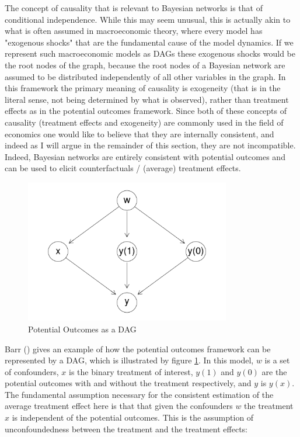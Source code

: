 \documentclass{article}
\begin{document}
The concept of causality that is relevant to Bayesian networks is that of conditional independence. While this may seem unusual, this is actually akin to what is often assumed in macroeconomic theory, where every model has "exogenous shocks" that are the fundamental cause of the model dynamics. If we represent such macroeconomic models as DAGs these exogenous shocks would be the root nodes of the graph, because the root nodes of a Bayesian network are assumed to be distributed independently of all other variables in the graph. In this framework the primary meaning of causality is exogeneity (that is in the literal sense, not being determined by what is observed), rather than treatment effects as in the potential outcomes framework. Since both of these concepts of causality (treatment effects and exogeneity) are commonly used in the field of economics one would like to believe that they are internally consistent, and indeed as I will argue in the remainder of this section, they are not incompatible. Indeed, Bayesian networks are entirely consistent with potential outcomes and can be used to elicit counterfactuals / (average) treatment effects.

\begin{figure}
  \centering
  \includegraphics[width=0.8\textwidth]{images/potential_outcomes_dag.png}
  \caption{Potential Outcomes as a DAG}
  \label{dag6}
\end{figure}

Barr (\citeyear{barr2018causal}) gives an example of how the potential outcomes framework can be represented by a DAG, which is illustrated by figure \ref{dag6}. In this model, $w$ is a set of confounders, $x$ is the binary treatment of interest, $y(1)$ and $y(0)$ are the potential outcomes with and without the treatment respectively, and $y$ is $y(x)$. The fundamental assumption necessary for the consistent estimation of the average treatment effect here is that that given the confounders $w$ the treatment $x$ is independent of the potential outcomes. This is the assumption of unconfoundedness between the treatment and the treatment effects:
 
\end{document}
